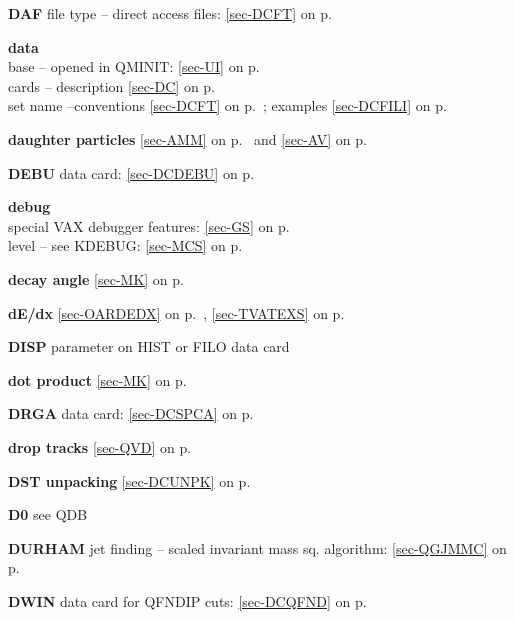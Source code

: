  \item{\bf DAF     }file type -- direct access files: \ref{sec-DCFT} on p.~\pageref{sec-DCFT}\\
 \item{\bf data}\\
 \subitem  base -- opened in QMINIT: \ref{sec-UI} on p.~\pageref{sec-UI}\\
 \subitem cards -- description \ref{sec-DC} on p.~\pageref{sec-DC}\\
 \subitem set name --conventions \ref{sec-DCFT} on p.~\pageref{sec-DCFT};
 examples \ref{sec-DCFILI} on p.~\pageref{sec-DCFILI}\\
 \item{\bf daughter particles }\ref{sec-AMM} on p.~\pageref{sec-AMM} and
 \ref{sec-AV} on p.~\pageref{sec-AV}\\
 \item{\bf DEBU    }data card: \ref{sec-DCDEBU} on p.~\pageref{sec-DCDEBU}\\
 \item{\bf debug }\\
 \subitem special VAX debugger features: \ref{sec-GS} on p.~\pageref{sec-GS}\\
 \subitem level -- see KDEBUG: \ref{sec-MCS} on p.~\pageref{sec-MCS}\\
 \item{\bf decay angle }\ref{sec-MK} on p.~\pageref{sec-MK}\\
 \item{\bf dE/dx       }\ref{sec-OARDEDX} on p.~\pageref{sec-OARDEDX},
 \ref{sec-TVATEXS} on p.~\pageref{sec-TVATEXS}\\
 \item{\bf DISP    }parameter on HIST or FILO  data card \\
 \item{\bf dot product }\ref{sec-MK} on p.~\pageref{sec-MK}\\
 \item{\bf DRGA    }data card: \ref{sec-DCSPCA} on p.~\pageref{sec-DCSPCA}\\
 \item{\bf drop tracks }\ref{sec-QVD} on p.~\pageref{sec-QVD}\\
 \item{\bf DST unpacking   }\ref{sec-DCUNPK} on p.~\pageref{sec-DCUNPK}\\
 \item{\bf D0 }see QDB\\
 \item{\bf DURHAM  }jet finding -- scaled invariant mass sq. algorithm:
 \ref{sec-QGJMMC} on p.~\pageref{sec-QGJMMC}\\
 \item{\bf DWIN    }data card for QFNDIP cuts: \ref{sec-DCQFND} on p.~\pageref{sec-DCQFND}
 
